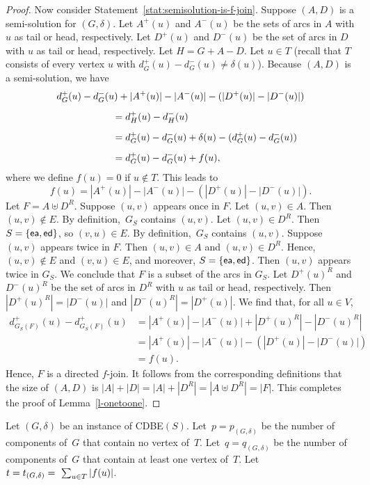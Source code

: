 \documentclass[11pt]{llncs}
\newcommand{\ed}{{\sf ed}}
\newcommand{\ea}{{\sf ea}}
\newcommand{\cdbe}{{\sc CDBE}}
\begin{document}
\begin{proof}
\medskip
\noindent
Now consider Statement~\ref{stat:semisolution-is-f-join}. Suppose $(A,D)$ is a semi-solution for $(G,\delta)$.  Let
$A^+(u)$ and $A^-(u)$ be the sets of arcs in $A$ with $u$ as tail or head,
respectively.  Let $D^+(u)$ and $D^-(u)$ be the set of arcs in $D$ with $u$ as
tail or head, respectively.  Let $H=G+A-D$. Let $u\in T$ (recall that $T$
consists of every vertex $u$ with $d^+_G(u)-d^-_G(u)\neq \delta(u)$).  Because
$(A,D)$ is a semi-solution, we have
\begin{gather*}
d^+_G(u)-d^-_G(u)+|A^+(u)|-|A^-(u)| - (|D^+(u)|-|D^-(u)|)\\[5pt]
\begin{align*}
\hspace*{5em}&= d^+_H(u)-d^-_H(u)\\[5pt]
&= d^+_G(u)-d^-_G(u)+\delta(u)-(d^+_G(u)-d^-_G(u))\\[5pt]
&= d^+_G(u)-d^-_G(u)+f(u),
\end{align*}
\end{gather*}
where we define $f(u)=0$ if $u\notin T$.  This leads to
\[f(u)=|A^+(u)|-|A^-(u)|-(|D^+(u)|-|D^-(u)|).\] Let $F=A\uplus D^R$.  Suppose
$(u,v)$ appears once in $F$.  Let $(u,v)\in A$. Then $(u,v)\notin E$. By
definition,~$G_S$ contains $(u,v)$.  Let $(u,v)\in D^R$. Then $S=\{\ea,\ed\}$, so $(v,u)\in E$. By
definition,~$G_S$ contains $(u,v)$. Suppose $(u,v)$ appears twice in $F$.
Then $(u,v)\in A$ and $(u,v)\in D^R$. Hence, $(u,v)\notin E$ and $(v,u)\in E$,
and moreover, $S=\{\ea,\ed\}$.  Then $(u,v)$ appears twice in $G_S$.  We
conclude that $F$ is a subset of the arcs in $G_S$.  Let $D^+(u)^R$ and
$D^-(u)^R$ be the set of arcs in $D^R$ with $u$ as tail or head, respectively.
Then $|D^+(u)^R|=|D^-(u)|$ and $|D^-(u)^R|=|D^+(u)|$. We find that, for all
$u\in V$,
\begin{align*}
d^+_{G_S(F)}(u)-d^+_{G_S(F)}(u) &= |A^+(u)|-|A^-(u)|+|D^+(u)^R|-|D^-(u)^R|\\[5pt]
&= |A^+(u)|-|A^-(u)|-(|D^+(u)|-|D^-(u)|)\\[5pt]
&= f(u).
\end{align*}
Hence, $F$ is a directed $f$-join.  It follows from the corresponding
definitions that the size of $(A,D)$ is $|A|+|D|=|A|+|D^R|=|A\uplus D^R|=|F|$.
This completes the proof of Lemma~\ref{l-onetoone}.
\end{proof} 

 
Let $(G,\delta)$ be an instance of \cdbe$(S)$.  Let~$p=p_{(G,\delta)}$ be the
number of components of~$G$ that contain no vertex of~$T$.
Let~$q=q_{(G,\delta)}$ be the number of components of~$G$ that contain at least
one vertex of~$T$.
Let $t=\nobreak t_{(G,\delta)}=~\sum_{u\in T}|f(u)|$.
\end{document}
